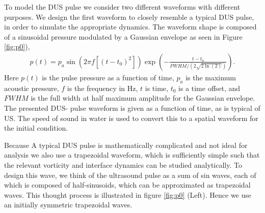 To model the \ac{DUS} pulse we consider two different waveforms with
different purposes. We design the first waveform to closely resemble
a typical \ac{DUS} pulse, in order to simulate the appropriate dynamics.
The waveform shape is composed of a sinusoidal pressure modulated by a
Gaussian envelope as seen in Figure \ref{fig:p0}),
%
\begin{align} \label{eq:us_waveform}
p(t)=p_a \sin{\left( 2\pi f \left[ \left(t-t_0\right)^2\right]\right)}
\exp{\left(-\frac{t-t_0}{FWHM/\left(2\sqrt{2\ln{\left(2\right)}}\right)}\right)}.
\end{align}
%
Here $p(t)$ is the pulse pressure as a function of time, $p_a$ is the
maximum acoustic pressure, $f$ is the frequency in Hz, $t$ is time,
$t_0$ is a time offset, and $FWHM$ is the full width at half maximum
amplitude for the Gaussian envelope. The presented \ac{DUS}- pulse
waveform is given as a function of time, as is typical of \ac{US}. The
speed of sound in water is used to convert this to a spatial waveform
for the initial condition.

Because A typical \ac{DUS} pulse is mathematically complicated and not
ideal for analysis we also use a trapezoidal waveform, which is
sufficiently simple such that the relevant vorticity and interface
dynamics can be studied analytically. To design this wave, we think of
the ultrasound pulse as a sum of sin waves, each of which is composed
of half-sinusoids, which can be approximated as trapezoidal
waves. This thought process is illustrated in figure \ref{fig:p0}
(Left). Hence we use an initially symmetric trapezoidal waves.


